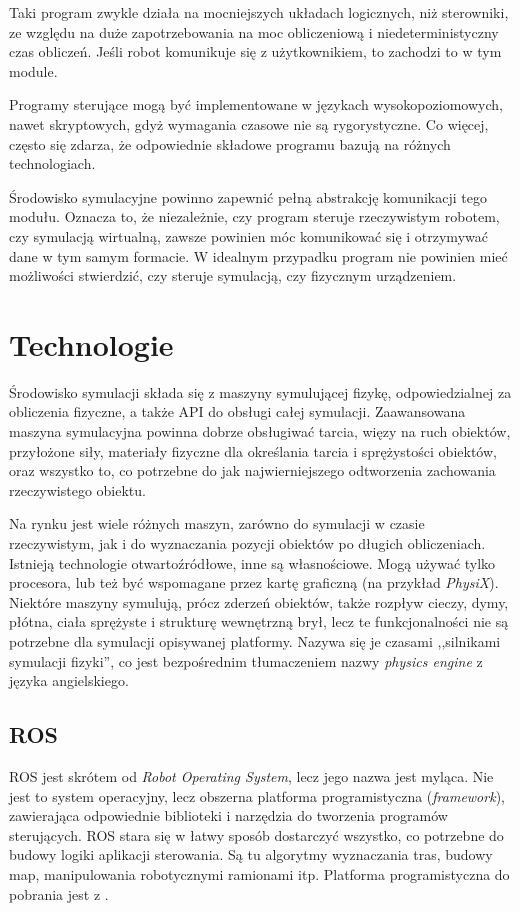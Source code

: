 		Taki program zwykle działa na mocniejszych układach logicznych, niż sterowniki, ze względu na duże zapotrzebowania na moc obliczeniową
		i niedeterministyczny czas obliczeń.
		Jeśli robot komunikuje się z użytkownikiem, to zachodzi to w tym module. 

		Programy sterujące mogą być implementowane w językach wysokopoziomowych, nawet skryptowych, gdyż wymagania czasowe nie są rygorystyczne.
		Co więcej, często się zdarza, że odpowiednie składowe programu bazują na różnych technologiach.

		Środowisko symulacyjne powinno zapewnić pełną abstrakcję komunikacji tego modułu.
		Oznacza to, że niezależnie, czy program steruje rzeczywistym robotem, czy symulacją wirtualną, zawsze powinien móc komunikować się i otrzymywać dane w tym samym formacie.
		W idealnym przypadku program nie powinien mieć możliwości stwierdzić, czy steruje symulacją, czy fizycznym urządzeniem.

\section{Technologie}
	Środowisko symulacji składa się z maszyny symulującej fizykę, odpowiedzialnej za obliczenia fizyczne, a także API do obsługi całej symulacji.
	Zaawansowana maszyna symulacyjna powinna dobrze obsługiwać tarcia, więzy na ruch obiektów, przyłożone siły, materiały fizyczne dla określania tarcia i sprężystości obiektów, 
	oraz wszystko to, co potrzebne do jak najwierniejszego odtworzenia zachowania rzeczywistego obiektu.

	Na rynku jest wiele różnych maszyn, zarówno do symulacji w czasie rzeczywistym, jak i do wyznaczania pozycji obiektów po długich obliczeniach.
	Istnieją technologie otwartoźródłowe, inne są własnościowe. Mogą używać tylko procesora, lub też być wspomagane przez kartę graficzną (na przykład \emph{PhysiX}).
	Niektóre maszyny symulują, prócz zderzeń obiektów, także rozpływ cieczy, dymy, płótna, ciała sprężyste i strukturę wewnętrzną brył, 
	lecz te funkcjonalności nie są potrzebne dla symulacji opisywanej platformy. Nazywa się je czasami ,,silnikami symulacji fizyki'', co jest bezpośrednim tłumaczeniem nazwy
	\emph{physics engine} z języka angielskiego.
	
	\subsection{ROS}
	ROS jest skrótem od \emph{Robot Operating System}, lecz jego nazwa jest myląca.
	Nie jest to system operacyjny, lecz obszerna platforma programistyczna (\emph{framework}), zawierająca odpowiednie biblioteki i narzędzia do tworzenia programów sterujących.
	ROS stara się w łatwy sposób dostarczyć wszystko, co potrzebne do budowy logiki aplikacji sterowania.
	Są tu algorytmy wyznaczania tras, budowy map, manipulowania robotycznymi ramionami itp. 
	Platforma programistyczna do pobrania jest z \cite{ros_website}.

